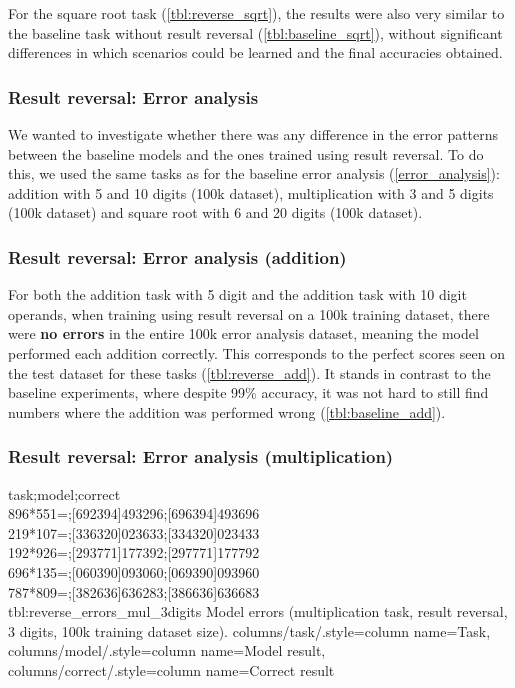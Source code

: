 
For the square root task (\cref{tbl:reverse_sqrt}), the results were also very similar to the baseline task without result reversal (\cref{tbl:baseline_sqrt}), without significant differences in which scenarios could be learned and  the final accuracies obtained.

\subsubsection{Result reversal: Error analysis}

We wanted to investigate whether there was any difference in the error patterns between the baseline models and the ones trained using result reversal. To do this, we used the same tasks as for the baseline error analysis (\cref{error_analysis}): addition with 5 and 10 digits (100k dataset), multiplication with 3 and 5 digits (100k dataset) and square root with 6 and 20 digits (100k dataset).


\subsubsection{Result reversal: Error analysis (addition)}
\label{resutl_reversal_error_add}

For both the addition task with 5 digit and the addition task with 10 digit operands, when training using result reversal on a 100k training dataset, there were \textbf{no errors} in the entire 100k error analysis dataset, meaning the model performed each addition correctly. This corresponds to the perfect scores seen on the test dataset for these tasks (\cref{tbl:reverse_add}).
It stands in contrast to the baseline experiments, where despite 99\% accuracy, it was not hard to still find numbers where the addition was performed wrong (\cref{tbl:baseline_add}).

\subsubsection{Result reversal: Error analysis (multiplication)}

{
task;model;correct\\
896*551=;[692394]493296;[696394]493696\\
219*107=;[336320]023633;[334320]023433\\
192*926=;[293771]177392;[297771]177792\\
696*135=;[060390]093060;[069390]093960\\
787*809=;[382636]636283;[386636]636683\\
}
{tbl:reverse_errors_mul_3digits}
{
    Model errors (multiplication task, result reversal, 3 digits, 100k training dataset size).
}
{
    columns/task/.style={column name={Task}},
    columns/model/.style={column name={Model result}},
    columns/correct/.style={column name={Correct result}}
}

